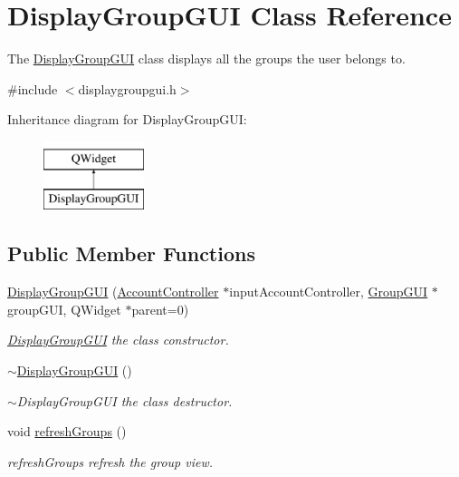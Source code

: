 \hypertarget{classDisplayGroupGUI}{}\section{Display\+Group\+G\+UI Class Reference}
\label{classDisplayGroupGUI}


The \hyperlink{classDisplayGroupGUI}{Display\+Group\+G\+UI} class displays all the groups the user belongs to.  




{\ttfamily \#include $<$displaygroupgui.\+h$>$}

Inheritance diagram for Display\+Group\+G\+UI\+:\begin{figure}[H]
\begin{center}
\leavevmode
\includegraphics[height=2.000000cm]{classDisplayGroupGUI}
\end{center}
\end{figure}
\subsection*{Public Member Functions}
\begin{DoxyCompactItemize}
\item 
\hyperlink{classDisplayGroupGUI_a135773a2eb2a66fcc62ad890d2105141}{Display\+Group\+G\+UI} (\hyperlink{classAccountController}{Account\+Controller} $\ast$input\+Account\+Controller, \hyperlink{classGroupGUI}{Group\+G\+UI} $\ast$group\+G\+UI, Q\+Widget $\ast$parent=0)
\begin{DoxyCompactList}\small\item\em \hyperlink{classDisplayGroupGUI}{Display\+Group\+G\+UI} the class constructor. \end{DoxyCompactList}\item 
\hyperlink{classDisplayGroupGUI_af960229828e6535114c55c1aa9292afd}{$\sim$\+Display\+Group\+G\+UI} ()
\begin{DoxyCompactList}\small\item\em $\sim$\+Display\+Group\+G\+UI the class destructor. \end{DoxyCompactList}\item 
void \hyperlink{classDisplayGroupGUI_ae7079b6cb5dd055b2f3753b83ec0f8b6}{refresh\+Groups} ()\hypertarget{classDisplayGroupGUI_ae7079b6cb5dd055b2f3753b83ec0f8b6}{}\label{classDisplayGroupGUI_ae7079b6cb5dd055b2f3753b83ec0f8b6}

\begin{DoxyCompactList}\small\item\em refresh\+Groups refresh the group view. \end{DoxyCompactList}\end{DoxyCompactItemize}


